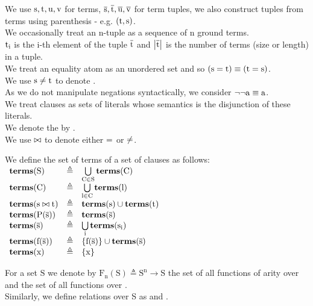 \noindent
We use $\mathrm{s,t,u,v}$ for terms, $\mathrm{\mathrm{\overline{s}},\mathrm{\overline{t}},\mathrm{\overline{u}},\mathrm{\overline{v}}}$ for term tuples,
we also construct tuples from terms using parenthesis - e.g. $\mathrm{(t,s)}$.\\
We occasionally treat an n-tuple as a sequence of n ground terms.\\
$\mathrm{t}_{\mathrm{i}}$ is the i-th element of the tuple $\mathrm{\overline{t}}$ and $\left|\mathrm{\overline{t}}\right|$ is the number of terms (size or length) in a tuple. \\
We treat an equality atom as an unordered set and so $\mathrm{(s=t)} \equiv \mathrm{(t=s)}$.\\
We use $\mathrm{s \neq t}$ to denote .\\
As we do not manipulate negations syntactically, we consider $\mathrm{\lnot \lnot a \equiv a}$.\\
We treat clauses as sets of literals whose semantics is the disjunction of these literals.\\
We denote the  by \newdef{\emptyClause}.\\
We use $\mathrm{\bowtie}$ to denote either $\mathrm{=}$ or $\mathrm{\neq}$.

\noindent
We define the set of terms  of a set of clauses as follows:\\
$
\begin{array}{llll}
\mathbf{terms}(\mathrm{S})           & \triangleq & \bigcup\limits_{\mathrm{C} \in \mathrm{S}} \mathbf{terms}(\mathrm{C}) \\ 
\mathbf{terms}(\mathrm{C})           & \triangleq & \bigcup\limits_{\mathrm{l} \in \mathrm{C}} \mathbf{terms}(\mathrm{l}) \\ 
\mathbf{terms}(\mathrm{s \bowtie t}) & \triangleq & \mathbf{terms}(\mathrm{s}) \cup \mathbf{terms}(\mathrm{t}) \\ 
\mathbf{terms}(\mathrm{\mathrm{P}(\mathrm{\overline{s}})})   & \triangleq & \mathbf{terms}(\mathrm{\mathrm{\overline{s}}}) \\ 
\mathbf{terms}(\mathrm{\mathrm{\overline{s}}})     & \triangleq & \mathrm{\bigcup\limits_{i} \mathbf{terms}(\mathrm{\mathrm{s}_{\mathrm{i}}})} \\ 
\mathbf{terms}(\mathrm{\mathrm{f}(\mathrm{\overline{s}})})   & \triangleq & \left\{\mathrm{\mathrm{f}(\mathrm{\overline{s}})}\right\} \cup \mathbf{terms}(\mathrm{\mathrm{\overline{s}}}) \\
\mathbf{terms}(\mathrm{x})           & \triangleq & \left\{\mathrm{x}\right\} \\
\end{array}
$

\noindent
For a set $\mathrm{S}$ we denote by $\mathrm{F_n(S)} \triangleq \mathrm{S^n} \rightarrow \mathrm{S}$ the set of all functions of arity  over  and  the set of all functions over .\\
Similarly, we define relations over S as  and .

